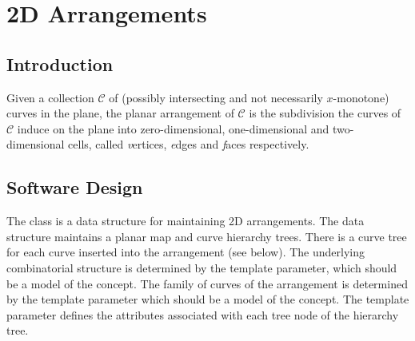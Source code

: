 
\chapter{2D Arrangements} 
\label{I1_ChapterArrangement_2}

\section{Introduction}

Given a collection ${\mathcal C}$ of (possibly intersecting and not 
necessarily  $x$-monotone) curves in the plane, the planar arrangement of 
${\mathcal C}$ is the subdivision the curves of ${\mathcal C}$ induce on
the plane into zero-dimensional, one-dimensional and two-dimensional cells,
called {\emph vertices}, {\emph edges} and {\emph faces} respectively.

\section{Software Design}
 
The class  is a data
structure for maintaining 2D arrangements. The data structure
maintains a planar map and curve hierarchy trees. There is a curve
tree for each curve inserted into the arrangement (see below). The
underlying combinatorial structure is determined by the
 template parameter, which should be a model of the
 concept. The family of curves of the
arrangement is determined by the  template parameter which
should be a model of the  concept. The
 template parameter defines the attributes associated
with each tree node of the hierarchy tree.

